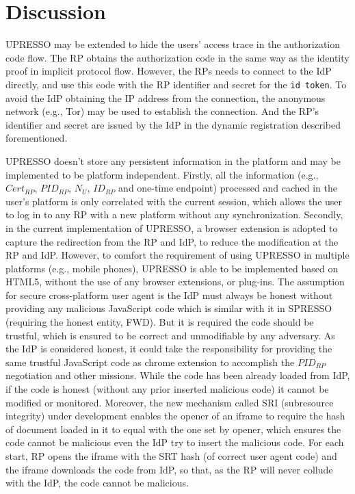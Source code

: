 \section{Discussion}
\label{sec:discussion}

 UPRESSO may be extended to hide the users' access trace in  the authorization code flow. The RP obtains the authorization code in the same way as the  identity proof in implicit protocol flow. However, the RPs needs to connect to the IdP directly, and  use this code with  the RP identifier and secret for the \verb+id token+. To avoid the IdP obtaining the IP address from the connection, the anonymous network (e.g., Tor) may be used to establish the connection. And the RP's identifier and secret are issued by the IdP in the dynamic registration described forementioned.


 UPRESSO doesn't store any persistent information in the platform and may be implemented to be platform independent. Firstly, all the information (e.g., $Cert_{RP}$, $PID_{RP}$, $N_U$, $ID_{RP}$ and one-time endpoint) processed and cached in the user's platform is only correlated with the current session, which allows the user to log in to any RP with a new platform without any synchronization. Secondly, in the current implementation of UPRESSO, a browser extension is adopted to capture the redirection from the RP and IdP, to reduce the modification at the RP and IdP.
However, to comfort the requirement of using UPRESSO in multiple platforms (e.g., mobile phones), UPRESSO is able to be implemented based on HTML5, without the use of any browser extensions, or plug-ins. The assumption for secure cross-platform user agent is the IdP must always be honest without providing any malicious JavaScript code which is similar with it in SPRESSO (requiring the honest entity, FWD). But it is required the code should be trustful, which is ensured to be correct and unmodifiable by any adversary. As the IdP is considered honest, it could take the responsibility for providing the same trustful JavaScript code as chrome extension to accomplish the $PID_{RP}$ negotiation and other missions. While the code has been already loaded from IdP, if the code is honest (without any prior inserted malicious code) it cannot be modified or monitored. Moreover, the new mechanism called SRI (subresource integrity) under development enables the opener of an iframe to require the hash of document loaded in it to equal with the one set by opener, which ensures the code cannot be malicious even the IdP try to insert the malicious code. For each start, RP opens the iframe with the SRT hash (of correct user agent code) and the iframe downloads the code from IdP, so that, as the RP will never collude with the IdP, the code cannot be malicious.

